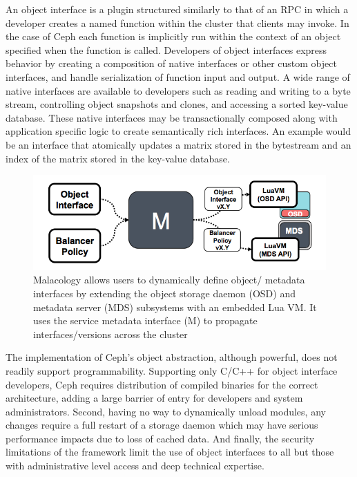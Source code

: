 An object
interface is a plugin structured similarly to that of an RPC in which a
developer creates a named function within the cluster that clients may invoke.
In the case of Ceph each function is implicitly run within the context of an
object specified when the function is called. Developers of object interfaces
express behavior by creating a composition of native interfaces or other custom
object interfaces, and handle serialization of function input and output.  A
wide range of native interfaces are available to developers such as reading and
writing to a byte stream, controlling object snapshots and clones, and
accessing a sorted key-value database. These native interfaces may be
transactionally composed along with application specific logic to create
semantically rich interfaces. An example would be an interface that atomically
updates a matrix stored in the bytestream and an index of the matrix stored in
the key-value database.\\

\begin{figure}[tbp]
\centering
\includegraphics{figures/implementation.png}
\caption{Malacology allows users to dynamically define
object/ metadata interfaces by extending the object
storage daemon (OSD) and metadata server (MDS) subsystems with an embedded Lua
VM.  It uses the service metadata interface (M) to propagate
interfaces/versions across the cluster \label{fig:implementation}}
\end{figure}

 The implementation of Ceph's object
abstraction, although powerful, does not readily support programmability.
Supporting only C/C++ for object interface developers, Ceph requires
distribution of compiled binaries for the correct architecture, adding a large
barrier of entry for developers and system administrators. Second, having no
way to dynamically unload modules, any changes require a full restart of a
storage daemon which may have serious performance impacts due to loss of cached
data. And finally, the security limitations of the framework limit the use of
object interfaces to all but those with administrative level access and deep
technical expertise.

